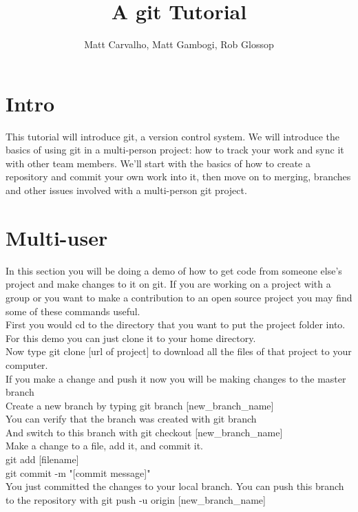 \documentclass[11pt]{report}
\title{A git Tutorial}
\author{Matt Carvalho, Matt Gambogi, Rob Glossop}
\begin{document}
\thispagestyle{empty}
\maketitle

\clearpage {} 

\tableofcontents

\listoffigures

\clearpage {}
\section{Intro}

This tutorial will introduce git, a version control system. We will
introduce the basics of using git in a multi-person project: how to
track your work and sync it with other team members. We'll start with
the basics of how to create a repository and commit your own work into
it, then move on to merging, branches and other issues involved with a
multi-person git project.

\section{Multi-user}

In this section you will be doing a demo of how to get code from someone else's project and make changes to it on git. If you are working on a project with a group or you want to make a contribution to an open source project you may find some of these commands useful.
\\ First you would cd to the directory that you want to put the project folder into. For this demo you can just clone it to your home directory.
\\ Now type git clone [url of project] to download all the files of that project to your computer.
\\ If you make a change and push it now you will be making changes to the master branch
\\ Create a new branch by typing git branch [new_branch_name]
\\ You can verify that the branch was created with git branch
\\ And switch to this branch with git checkout [new_branch_name]
\\ Make a change to a file, add it, and commit it.
\\ git add [filename]
\\ git commit -m "[commit message]"
\\ You just committed the changes to your local branch. You can push this branch to the repository with git push -u origin [new_branch_name]
\end{document}
